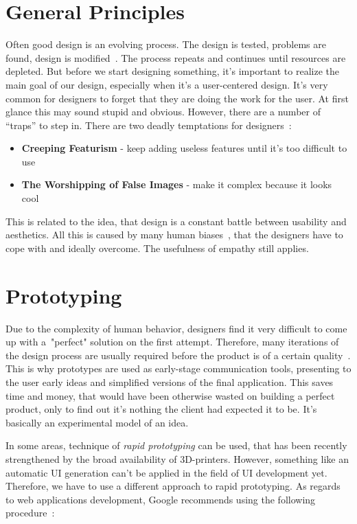 \section{General Principles}
Often good design is an evolving process. The design is tested, problems are found, design is modified~\cite{Norman}. The process repeats and continues until resources are depleted. But before we start designing something, it’s important to realize the main goal of our design, especially when it’s a user-centered design. It’s very common for designers to forget that they are doing the work for the user. At first glance this may sound stupid and obvious. However, there are a number of “traps” to step in.
There are two deadly temptations for designers~\cite{Norman}:
\begin{itemize}
\item \textbf{Creeping Featurism} - keep adding useless features until it’s too difficult to use
\item \textbf{The Worshipping of False Images} - make it complex because it looks cool
\end{itemize}
This is related to the idea, that design is a constant battle between usability and aesthetics. All this is caused by many human biases~\cite{HumanBiases}, that the designers have to cope with and ideally overcome. The usefulness of empathy still applies.


\section{Prototyping}
Due to the complexity of human behavior, designers find it very difficult to come up with a~"perfect" solution on the first attempt. Therefore, many iterations of the design process are usually required before the product is of a certain quality~\cite{Dix}. This is why prototypes are used as early-stage communication tools, presenting to the user early ideas and simplified versions of the final application. This saves time and money, that would have been otherwise wasted on building a perfect product, only to find out it’s nothing the client had expected it to be. It’s basically an experimental model of an idea.

In some areas, technique of \textit{rapid prototyping} can be used, that has been recently strengthened by the broad availability of 3D-printers. However, something like an automatic UI generation can’t be applied in the field of UI development yet. Therefore, we have to use a different approach to rapid prototyping. As regards to web applications development, Google recommends using the following procedure~\cite{RapidPrototyping}:

